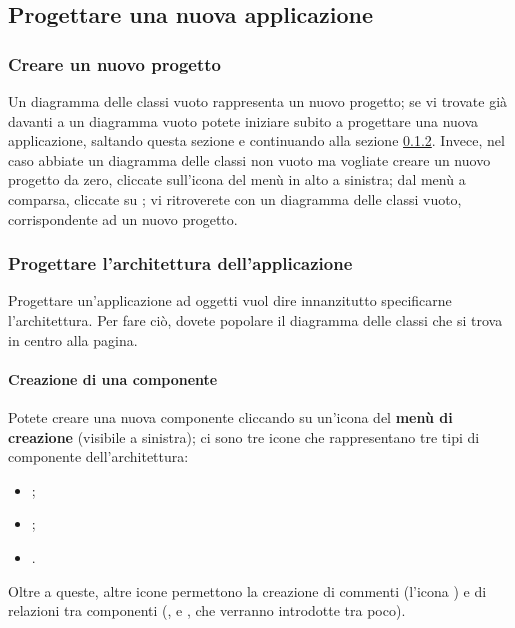 \subsection{Progettare una nuova applicazione} \label{sec:new}

\subsubsection{Creare un nuovo progetto}
Un diagramma delle classi vuoto rappresenta un nuovo progetto; se vi trovate già davanti a un diagramma vuoto potete iniziare subito a progettare una nuova applicazione, saltando questa sezione e continuando alla sezione \ref{par:arch}. Invece, nel caso abbiate un diagramma delle classi non vuoto ma vogliate creare un nuovo progetto da zero, cliccate sull'icona del menù in alto a sinistra; dal menù a comparsa, cliccate su ; vi ritroverete con un diagramma delle classi vuoto, corrispondente ad un nuovo progetto.

\subsubsection{Progettare l'architettura dell'applicazione} \label{par:arch}
Progettare un'applicazione ad oggetti vuol dire innanzitutto specificarne l'architettura. Per fare ciò, dovete popolare il diagramma delle classi che si trova in centro alla pagina.

\paragraph{Creazione di una componente} \label{par:creaz_class} Potete creare una nuova componente cliccando su un'icona del \textbf{menù di creazione} (visibile a sinistra); ci sono tre icone che rappresentano tre tipi di componente dell'architettura:
\begin{itemize}
	\item {};
	\item {};
	\item {}.
\end{itemize}
Oltre a queste, altre icone permettono la creazione di commenti (l'icona ) e di relazioni tra componenti (,  e , che verranno introdotte tra poco).

